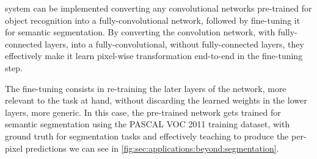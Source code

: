 \citeauthor{Long2015} system can be implemented converting any convolutional networks pre-trained for object recognition into a fully-convolutional network, followed by fine-tuning it for semantic segmentation.
By converting the convolution network, with fully-connected layers, into a fully-convolutional, without fully-connected layers, they effectively make it learn pixel-wise transformation end-to-end in the fine-tuning step.

The fine-tuning consists in re-training the later layers of the network, more relevant to the task at hand, without discarding the learned weights in the lower layers, more generic.
In this case, the pre-trained network gets trained for semantic segmentation using the PASCAL VOC 2011 training dataset, with ground truth for segmentation tasks and effectively teaching to produce the per-pixel predictions we can see in \autoref{fig:sec:applications:beyond:segmentation}.
